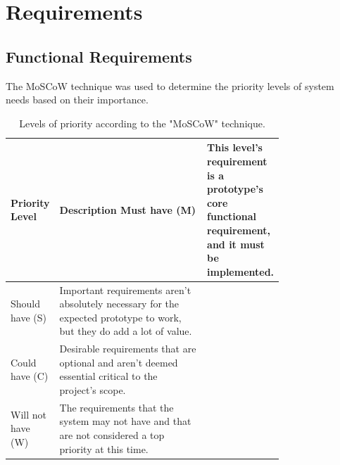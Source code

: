 \section{Requirements}

\subsection{Functional Requirements}
The MoSCoW technique was used to determine the priority levels of system needs based on their importance.

\begin{longtable}{|l|p{0.77\linewidth}|}
\caption{Levels of priority according to the "MoSCoW" technique.}\\ 
\hline
\textbf{Priority Level} & \textbf{Description}                                                                                                    \endfirsthead 
\hline
Must have (M)           & This level's requirement is a prototype's core functional requirement, and it must be implemented.                      \\ 
\hline
Should have (S)         & Important requirements aren't absolutely necessary for the expected prototype to work, but they do add a lot of value.  \\ 
\hline
Could have (C)          & Desirable requirements that are optional and aren't deemed essential critical to the project's scope.                   \\ 
\hline
Will not have (W)       & The requirements that the system may not have and that are not considered a top priority at this time.                  \\
\hline
\end{longtable}


